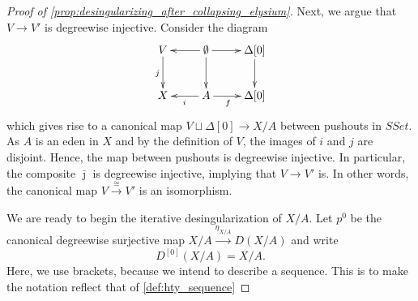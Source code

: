 \begin{proof}[Proof of \cref{prop:desingularizing_after_collapsing_elysium}]
Next, we argue that $V\to V'$ is degreewise injective. Consider the diagram
\begin{displaymath}
\xymatrix{
 V \ar[d]_j & \emptyset \ar[l] \ar[d] \ar[r] & \Delta [0] \ar[d] \\
 X & A \ar[l]^i \ar[r]_(.45)f & \Delta [0]
 }
\end{displaymath}
which gives rise to a canonical map $V\sqcup \Delta [0]\to X/A$ between pushouts in $SSet$. As $A$ is an eden in $X$ and by the definition of $V$, the images of $i$ and $j$ are disjoint. Hence, the map between pushouts is degreewise injective. In particular, the composite $\bar{\jmath }$ is degreewise injective, implying that $V\to V'$ is. In other words, the canonical map $V\xrightarrow{\cong } V'$ is an isomorphism.

We are ready to begin the iterative desingularization of $X/A$. Let $p^0$ be the canonical degreewise surjective map $X/A\xrightarrow{\eta _{X/A} } D(X/A)$ and write
\[D^{[0]}(X/A)=X/A.\]
Here, we use brackets, because we intend to describe a sequence. This is to make the notation reflect that of  \cref{def:hty_sequence}


\end{proof}
